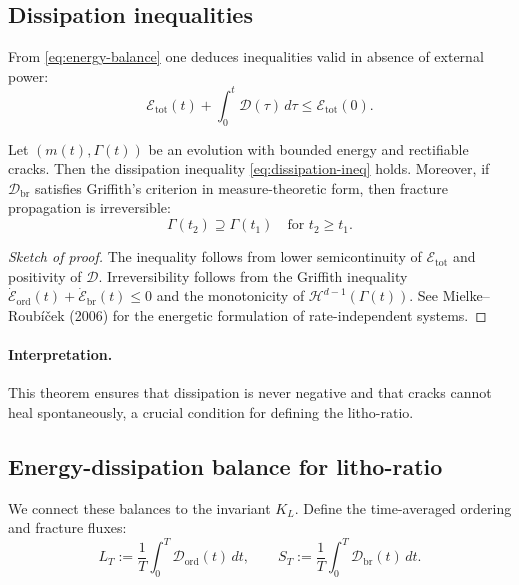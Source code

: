 \subsection{Dissipation inequalities}
From \eqref{eq:energy-balance} one deduces inequalities valid in absence of external power:
\begin{equation}\label{eq:dissipation-ineq}
  \mathcal{E}_{\mathrm{tot}}(t) + \int_0^t \mathcal{D}(\tau)\,d\tau
   \leq \mathcal{E}_{\mathrm{tot}}(0).
\end{equation}

\begin{theorem}\label{thm:dissipation}
Let $(m(t),\Gamma(t))$ be an evolution with bounded energy and rectifiable cracks. 
Then the dissipation inequality \eqref{eq:dissipation-ineq} holds. 
Moreover, if $\mathcal{D}_{\mathrm{br}}$ satisfies Griffith's criterion in measure-theoretic form,
then fracture propagation is irreversible:
\[
  \Gamma(t_2)\supseteq \Gamma(t_1)\quad \text{for }t_2\ge t_1.
\]
\end{theorem}

\begin{proof}[Sketch of proof]
The inequality follows from lower semicontinuity of $\mathcal{E}_{\mathrm{tot}}$ 
and positivity of $\mathcal{D}$. Irreversibility follows from the Griffith inequality 
$\dot{\mathcal{E}}_{\mathrm{ord}}(t) + \dot{\mathcal{E}}_{\mathrm{br}}(t)\le 0$ 
and the monotonicity of $\mathcal{H}^{d-1}(\Gamma(t))$.  
See Mielke--Roubíček (2006) for the energetic formulation of rate-independent systems.
\end{proof}

\paragraph{Interpretation.}
This theorem ensures that dissipation is never negative and that cracks cannot heal spontaneously, 
a crucial condition for defining the litho-ratio.

\subsection{Energy-dissipation balance for litho-ratio}
We connect these balances to the invariant $K_L$. 
Define the time-averaged ordering and fracture fluxes:
\[
  L_T := \frac{1}{T}\int_0^T \mathcal{D}_{\mathrm{ord}}(t)\,dt,
  \qquad
  S_T := \frac{1}{T}\int_0^T \mathcal{D}_{\mathrm{br}}(t)\,dt.
\]

